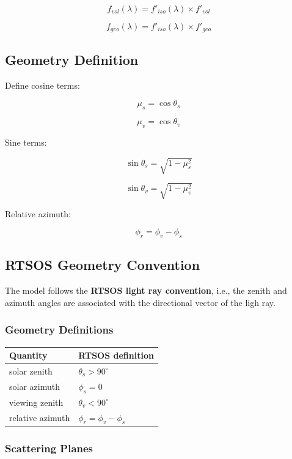 \documentclass[
  letterpaper,
]{scrbook}
\begin{document}
\[
f_{vol}(\lambda) = f'_{iso}(\lambda) \times f'_{vol}
\]

\[
f_{geo}(\lambda) = f'_{iso}(\lambda) \times f'_{geo}
\]

\subsection{Geometry Definition}\label{geometry-definition}

Define cosine terms:

\[
\mu_s = \cos\theta_s
\]

\[
\mu_v = \cos\theta_v
\]

Sine terms:

\[
\sin\theta_s = \sqrt{1-\mu_s^2}
\]

\[
\sin\theta_v = \sqrt{1-\mu_v^2}
\]

Relative azimuth:

\[
\phi_r = \phi_v - \phi_s
\]

\subsection{RTSOS Geometry Convention}\label{rtsos-geometry-convention}

The model follows the \textbf{RTSOS light ray convention}, i.e., the
zenith and azimuth angles are associated with the directional vector of
the ligh ray.

\subsubsection{Geometry Definitions}\label{geometry-definitions}

\begin{longtable}[]{@{}ll@{}}
\toprule\noalign{}
Quantity & RTSOS definition \\
\midrule\noalign{}
\endhead
\bottomrule\noalign{}
\endlastfoot
solar zenith & \(\theta_s > 90^\circ\) \\
solar azimuth & \(\phi_s = 0\) \\
viewing zenith & \(\theta_v < 90^\circ\) \\
relative azimuth & \(\phi_r = \phi_v - \phi_s\) \\
\end{longtable}

\subsubsection{Scattering Planes}\label{scattering-planes}
\end{document}
